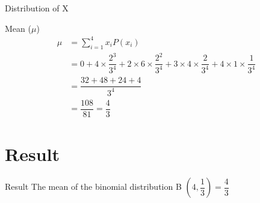 \documentclass{beamer}
\providecommand{\brak}[1]{\ensuremath{\left(#1\right)}}
\begin{document}
    \begin{frame}{Distribution of X}
    \begin{table}[ht!]
    \def\arraystretch{1.53}
        
        \caption{Probability Distribution of X}
        \label{Table1}
    \end{table}
    \end{frame}
    
    \begin{frame}{Mean ($\mu$)}
        \begin{align}
            \mu &= \sum^{4}_{i=1} x_i P(x_i) \\
                &= 0 + 4 \times \dfrac{2^3}{3^4} + 2 \times 6 \times \dfrac{2^2}{3^4} + 3 \times 4 \times \dfrac{2}{3^4} + 4 \times 1 \times \dfrac{1}{3^4} \\[10pt]
                &= \dfrac{32 + 48 + 24 + 4}{3^4} \\[10pt]
                &= \dfrac{108}{81} = \dfrac{4}{3}
        \end{align}
    \end{frame}
    
    \section{Result}
    \begin{frame}{Result}
        The mean of the binomial distribution B $\brak{4,\dfrac{1}{3}} = \dfrac{4}{3}$
    \end{frame}
\end{document}
